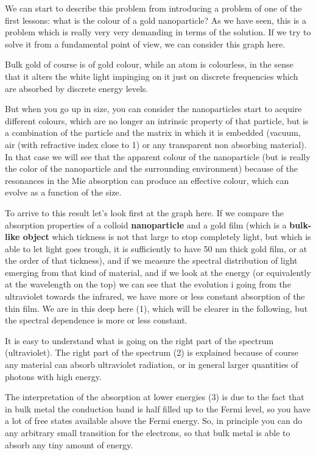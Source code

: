 \documentclass[../main/main.tex]{subfiles}
\begin{document}
We can start to describe this problem from introducing a problem of one of the first lessons: what is the colour of a gold nanoparticle?
As we have seen, this is a problem which is really very very demanding in terms of the solution. If we try to solve it from a fundamental point of view, we can consider this graph here.

Bulk gold of course is of gold colour, while an atom is colourless, in the sense that it alters the white light impinging on it just on discrete frequencies which are absorbed by discrete energy levels.

But when you go up in size, you can consider the  nanoparticles start to acquire different colours, which are no longer an intrinsic property of that particle, but is a combination of the particle and the matrix in which it is embedded (vacuum, air (with refractive index close to 1) or any transparent non absorbing material). In that case we will see that the apparent colour of the nanoparticle (but is really the color of the nanoparticle and the surrounding environment) because of the resonances in the Mie absorption can produce an effective colour, which can evolve as a function of the size.

To arrive to this result let's look first at the graph here.
If we compare the absorption properties of a colloid \textbf{nanoparticle} and a gold film (which is a \textbf{bulk-like object}  which tickness is not that large to stop completely light, but which is able to let light goes trough, it is sufficiently to have 50 nm thick gold film, or at the order of that tickness), and if we measure the spectral distribution of light emerging from that kind of material, and if we look at the energy (or equivalently at the wavelength on the top) we can see that the evolution i going from the ultraviolet towards the infrared, we have more or less constant absorption of the thin film. We are in this deep here (1), which will be clearer in the following, but the spectral dependence is more or less constant.


It is easy to understand what is going on the right part of the spectrum (ultraviolet).
The right part of the spectrum (2) is explained because of course any material can absorb ultraviolet radiation, or in general larger quantities of photons with high energy.

The interpretation of the absorption at lower energies (3) is due to the fact that in bulk metal the conduction band is half filled up to the Fermi level, so you have a lot of free states available above the Fermi energy.
So, in principle you can do any arbitrary small transition for the electrons, so that bulk metal is able to absorb any tiny amount of energy.
\end{document}
